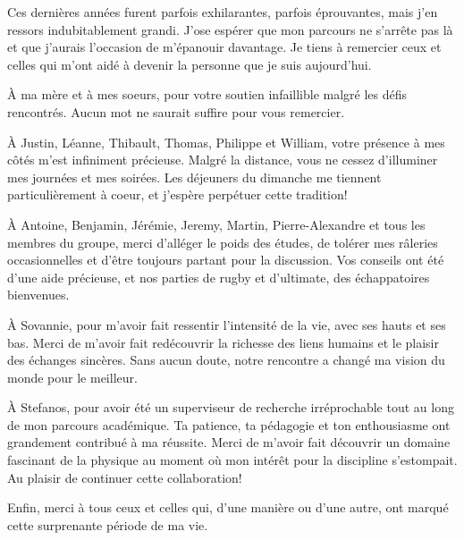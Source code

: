 Ces dernières années furent parfois exhilarantes, parfois éprouvantes, mais j'en ressors indubitablement grandi. J'ose espérer que mon parcours ne s'arrête pas là et que j'aurais l'occasion de m'épanouir davantage. Je tiens à remercier ceux et celles qui m'ont aidé à devenir la personne que je suis aujourd'hui.

À ma mère et à mes soeurs, pour votre soutien infaillible malgré les défis rencontrés. Aucun mot ne saurait suffire pour vous remercier.

À Justin, Léanne, Thibault, Thomas, Philippe et William, votre présence à mes côtés m'est infiniment précieuse. Malgré la distance, vous ne cessez d'illuminer mes journées et mes soirées. Les déjeuners du dimanche me tiennent particulièrement à coeur, et j'espère perpétuer cette tradition!

À Antoine, Benjamin, Jérémie, Jeremy, Martin, Pierre-Alexandre et tous les membres du groupe, merci d'alléger le poids des études, de tolérer mes râleries occasionnelles et d'être toujours partant pour la discussion. Vos conseils ont été d'une aide précieuse, et nos parties de rugby et d'ultimate, des échappatoires bienvenues.

À Sovannie, pour m'avoir fait ressentir l'intensité de la vie, avec ses hauts et ses bas. Merci de m'avoir fait redécouvrir la richesse des liens humains et le plaisir des échanges sincères. Sans aucun doute, notre rencontre a changé ma vision du monde pour le meilleur.

À Stefanos, pour avoir été un superviseur de recherche irréprochable tout au long de mon parcours académique. Ta patience, ta pédagogie et ton enthousiasme ont grandement contribué à ma réussite. Merci de m'avoir fait découvrir un domaine fascinant de la physique au moment où mon intérêt pour la discipline s'estompait. Au plaisir de continuer cette collaboration!

Enfin, merci à tous ceux et celles qui, d'une manière ou d'une autre, ont marqué cette surprenante période de ma vie.

